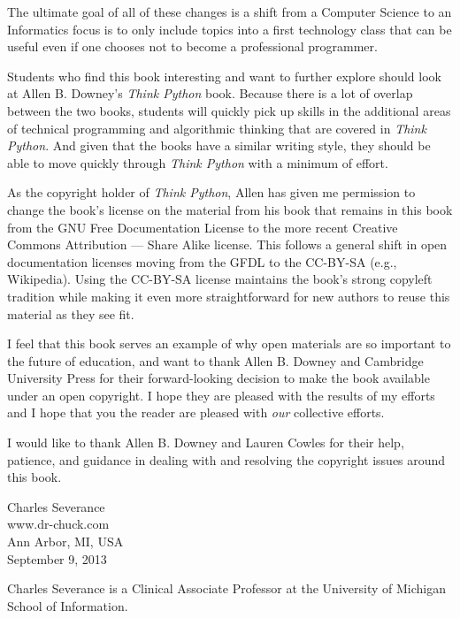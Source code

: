The ultimate goal of all of these changes is a shift from a 
Computer Science to an Informatics
focus is to only include topics into a first technology 
class that can be useful even if one chooses not to 
become a professional programmer.

Students who find this book interesting and want to further explore
should look at Allen B. Downey's \emph{Think Python} book.  Because there
is a lot of overlap between the two books,
students will quickly pick up skills in the additional
areas of technical programming and algorithmic thinking 
that are covered in \emph{Think Python}.
And given that the books have a similar writing style, they should be 
able to move quickly through \emph{Think Python} with a minimum of effort.

As the copyright holder of \emph{Think Python},
Allen has given me permission to change the book's license 
on the material from his book that remains in this book
from the
GNU Free Documentation License 
to the more recent
Creative Commons Attribution --- Share Alike
license.
This follows a general shift in open documentation licenses moving 
from the GFDL to the CC-BY-SA (e.g., Wikipedia).
Using the CC-BY-SA license maintains the book's 
strong copyleft tradition while making it even more straightforward 
for new authors to reuse this material as they see fit.

I feel that this book serves an example of why open 
materials are so important to the future of education,
and want to thank Allen B. Downey and Cambridge University
Press for their forward-looking decision to make the book available
under an open copyright.   I hope they are pleased with the 
results of my efforts and I hope that you the reader are pleased with
\emph{our} collective efforts.

I would like to thank Allen B. Downey and Lauren Cowles for their help,
patience, and guidance in dealing with and resolving the copyright 
issues around this book.

Charles Severance\\
www.dr-chuck.com\\
Ann Arbor, MI, USA\\
September 9, 2013

Charles Severance is a 
Clinical Associate Professor 
at the University of Michigan School of Information.

\clearemptydoublepage

\begin{latexonly}

\tableofcontents

\clearemptydoublepage

\end{latexonly}

\mainmatter

